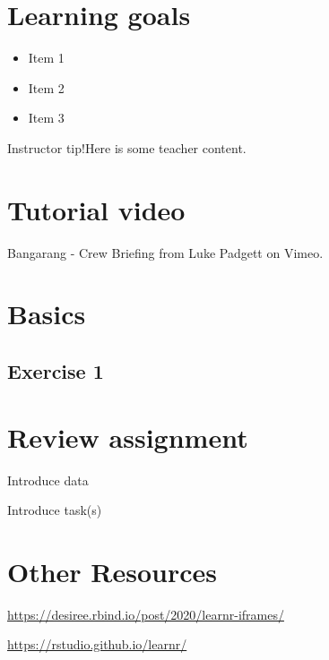 \documentclass[
]{book}
\providecommand{\tightlist}{%
  \setlength{\itemsep}{0pt}\setlength{\parskip}{0pt}}
\begin{document}
\hypertarget{learning-goals-9}{%
\section*{Learning goals}\label{learning-goals-9}}

\begin{itemize}
\tightlist
\item
  Item 1\\
\item
  Item 2\\
\item
  Item 3
\end{itemize}

Instructor tip!Here is some teacher content.

\hypertarget{tutorial-video-2}{%
\section*{Tutorial video}\label{tutorial-video-2}}

Bangarang - Crew Briefing from Luke Padgett on Vimeo.

\hypertarget{basics-1}{%
\section*{Basics}\label{basics-1}}

\hypertarget{exercise-1-6}{%
\subsection*{Exercise 1}\label{exercise-1-6}}

\hypertarget{review-assignment-9}{%
\section*{Review assignment}\label{review-assignment-9}}

Introduce data

Introduce task(s)

\hypertarget{other-resources-8}{%
\section*{Other Resources}\label{other-resources-8}}

\url{https://desiree.rbind.io/post/2020/learnr-iframes/}

\url{https://rstudio.github.io/learnr/}

  
\end{document}
